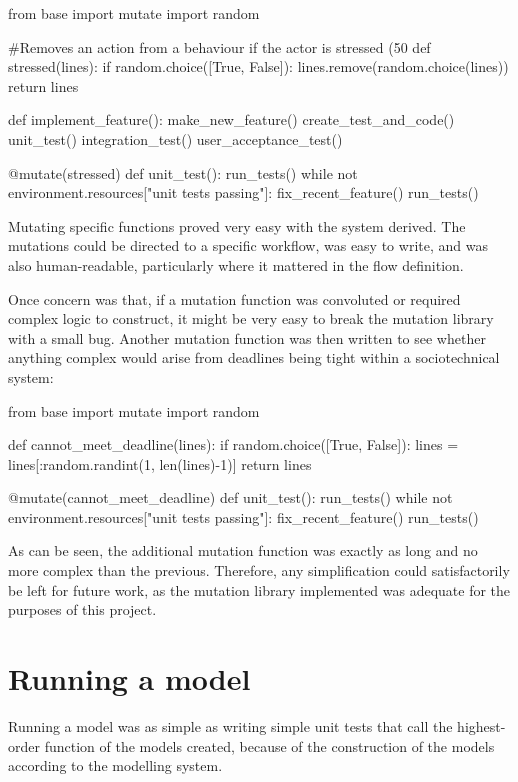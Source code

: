 \begin{pyglist}[language = python, encoding = utf8]
from base import mutate
import random

#Removes an action from a behaviour if the actor is stressed (50%
def stressed(lines):
    if random.choice([True, False]):
        lines.remove(random.choice(lines))
    return lines
    

def implement_feature():
    make_new_feature()
    create_test_and_code()
    unit_test()
    integration_test()
    user_acceptance_test()

@mutate(stressed)
def unit_test():
    run_tests()
    while not environment.resources["unit tests passing"]:
        fix_recent_feature()
        run_tests()
\end{pyglist}\par
Mutating specific functions proved very easy with the system derived. The mutations could be directed to a specific workflow, was easy to write, and was also human-readable, particularly where it mattered in the flow definition.\par

Once concern was that, if a mutation function was convoluted or required complex logic to construct, it might be very easy to break the mutation library with a small bug. Another mutation function was then written to see whether anything complex would arise from deadlines being tight within a sociotechnical system:

\begin{pyglist}[language = python, encoding = utf8]
from base import mutate
import random

def cannot_meet_deadline(lines):
    if random.choice([True, False]):
        lines = lines[:random.randint(1, len(lines)-1)]
    return lines

@mutate(cannot_meet_deadline)
def unit_test():
    run_tests()
    while not environment.resources["unit tests passing"]:
        fix_recent_feature()
        run_tests()
\end{pyglist}\par
As can be seen, the additional mutation function was exactly as long and no more complex than the previous. Therefore, any simplification could satisfactorily be left for future work, as the mutation library implemented was adequate for the purposes of this project.\par

\section{Running a model}
Running a model was as simple as writing simple unit tests that call the highest-order function of the models created, because of the construction of the models according to the modelling system. \par

